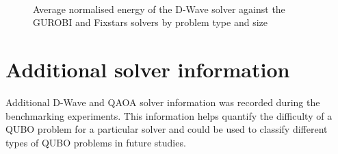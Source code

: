 \begin{figure}[!htb]
    \centering
    \\
    \caption{Average normalised energy of the D-Wave solver against the GUROBI and Fixstars solvers by problem type and size}
    \label{all-time-size}
\end{figure}

\section{Additional solver information}
Additional D-Wave and QAOA solver information was recorded during the benchmarking experiments. This information helps quantify the difficulty of a QUBO problem for a particular solver and could be used to classify different types of QUBO problems in future studies.

